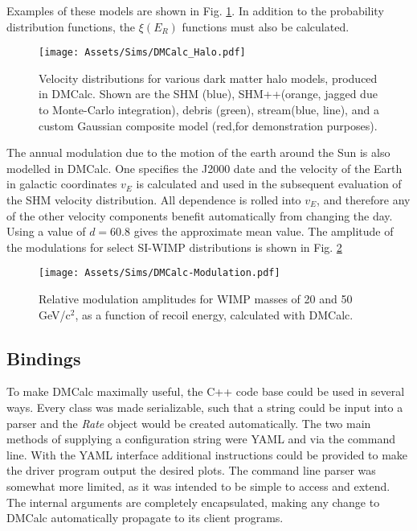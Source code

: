 Examples of these models are shown in Fig. \ref{fig:halo_types}.
In addition to the probability distribution functions, the $\xi(E_R)$ functions must also be calculated.

\begin{figure}
    \centering
    \texttt{[image: Assets/Sims/DMCalc\_Halo.pdf]}
    \caption[Velocity distributions for various dark matter halo models, produced in DMCalc.]%
    {Velocity distributions for various dark matter halo models, produced in DMCalc.
    Shown are the SHM\cite{mccabe_earths_2014} (blue), SHM++\cite{evans_refinement_2019}(orange, jagged due to Monte-Carlo integration), debris\cite{kuhlen_direct_2012} (green), stream\cite{banik_probing_2018}(blue, line), and a custom Gaussian composite model (red,for demonstration purposes).}
    \label{fig:halo_types}
\end{figure}

The annual modulation due to the motion of the earth around the Sun is also modelled in DMCalc. 
One specifies the J2000 date and the velocity of the Earth in galactic coordinates $v_E$ is calculated and used in the subsequent evaluation of the SHM velocity distribution.
All dependence is rolled into $v_E$, and therefore any of the other velocity components benefit automatically from changing the day.
Using a value of $d=60.8$ gives the approximate mean value.
The amplitude of the modulations for select SI-WIMP distributions is shown in Fig. \ref{fig:modulations}
\begin{figure}
    \centering
    \texttt{[image: Assets/Sims/DMCalc-Modulation.pdf]}
    \caption{Relative modulation amplitudes for WIMP masses of 20 and 50 GeV/c$^2$, as a function of recoil energy, calculated with DMCalc.}
    \label{fig:modulations}
\end{figure}
\subsection{Bindings}

To make DMCalc maximally useful, the C++ code base could be used in several ways.
Every class was made serializable, such that a string could be input into a parser and the \textit{Rate} object would be created automatically.
The two main methods of supplying a configuration string were YAML\cite{noauthor_yaml_nodate} and via the command line.
With the YAML interface additional instructions could be provided to make the driver program output the desired plots.
The command line parser was somewhat more limited, as it was intended to be simple to access and extend.
The internal arguments are completely encapsulated, making any change to DMCalc automatically propagate to its client programs.

